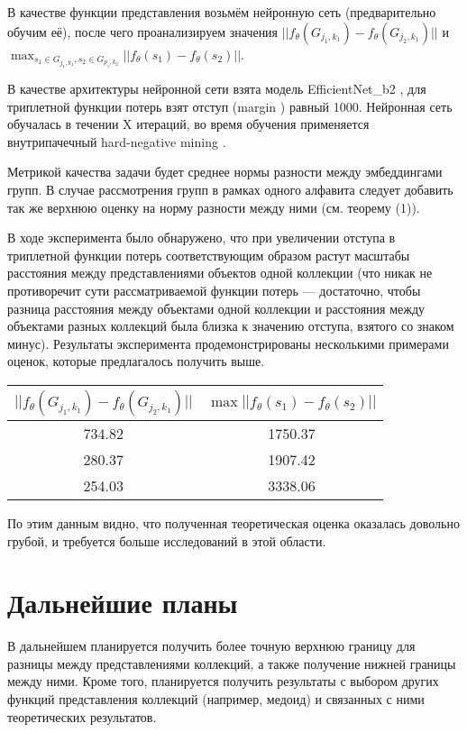 \documentclass{article}
\begin{document}
В качестве функции представления возьмём нейронную сеть (предварительно обучим её), после чего проанализируем значения $||f_\theta(G_{j_1, k_1}) - f_\theta(G_{j_2, k_1})||$ и $\max_{s_1 \in G_{j_1, k_1}, s_2 \in G_{p_1, k_2}}{||f_{\theta}(s_1) - f_{\theta}(s_2)||}$.

В качестве архитектуры нейронной сети взята модель EfficientNet\_b2 \cite{tan2020efficientnet}, для триплетной функции потерь взят отступ (margin \cite{TripletLoss}) равный 1000. Нейронная сеть обучалась в течении X итераций, во время обучения применяется внутрипачечный hard-negative mining \cite{Bootstrapping}.

Метрикой качества задачи будет среднее нормы разности между эмбеддингами групп. В случае рассмотрения групп в рамках одного алфавита следует добавить так же верхнюю оценку на норму разности между ними (см. теорему (1)).

В ходе эксперимента было обнаружено, что при увеличении отступа в триплетной функции потерь соответствующим образом растут масштабы расстояния между представлениями объектов одной коллекции (что никак не противоречит сути рассматриваемой функции потерь --- достаточно, чтобы разница расстояния между объектами одной коллекции и расстояния между объектами разных коллекций была близка к значению отступа, взятого со знаком минус). Результаты эксперимента продемонстрированы несколькими примерами оценок, которые предлагалось получить выше.
\newline

\begin{center}
\renewcommand{\arraystretch}{1.5}

\begin{tabular}[H]{ | c | c | }
 \hline
 $||f_\theta(G_{j_1, k_1}) - f_\theta(G_{j_2, k_1})||$ & $\max{||f_{\theta}(s_1) - f_{\theta}(s_2)||}$\\
 \hline
  734.82 & 1750.37 \\
  280.37 & 1907.42 \\
  254.03 & 3338.06\\
 \hline
\end{tabular}
\end{center}


По этим данным видно, что полученная теоретическая оценка оказалась довольно грубой, и требуется больше исследований в этой области.

\section{Дальнейшие планы}

В дальнейшем планируется получить более точную верхнюю границу для разницы между представлениями коллекций, а также получение нижней границы между ними. Кроме того, планируется получить результаты с выбором других функций представления коллекций (например, медоид) и связанных с ними теоретических результатов.

\newpage
\nocite{*}


\printbibliography
\end{document}
